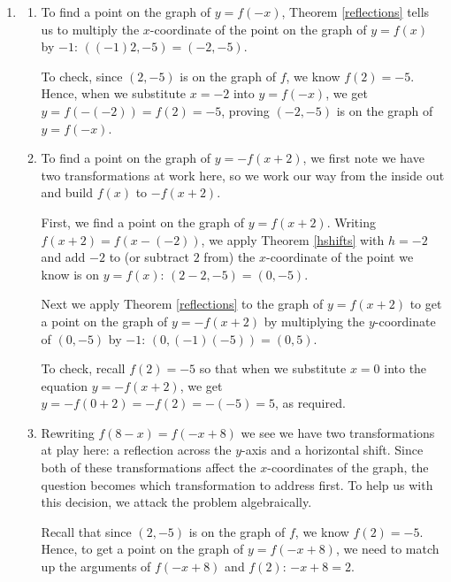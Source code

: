 \documentclass{ximera}
\begin{document}
\begin{example}
\begin{enumerate}
 \item 
 
 \begin{enumerate}
 
 \item To find a point on the graph of $y=f(-x)$, Theorem \ref{reflections} tells us to multiply the $x$-coordinate of the point on the graph of $y=f(x)$ by $-1$:  $((-1)2, -5) = (-2,-5)$.  
 
 \smallskip
 
 To check, since $(2,-5)$ is on the graph of $f$, we know $f(2) = -5$.  Hence, when we substitute $x=-2$ into $y = f(-x)$, we get $y = f(-(-2)) = f(2) = -5$, proving $(-2,-5)$ is on the graph of $y=f(-x)$.
 
 \item To find a point on the graph of $y = -f(x+2)$, we first note we have two transformations at work here, so we work our way from the inside out and build $f(x)$ to $-f(x+2)$. 
 
 \smallskip
 
 First, we find a point on the graph of $y=f(x+2)$.  Writing $f(x+2) = f(x-(-2))$, we apply Theorem \ref{hshifts} with $h=-2$ and add $-2$ to (or subtract $2$ from) the $x$-coordinate of the point we know is on $y=f(x)$:   $(2-2,-5) =  (0,-5)$. 
 
 \smallskip
 
  Next we apply Theorem \ref{reflections} to the graph of $y=f(x+2)$ to get a point on the graph of $y=-f(x+2)$ by multiplying the $y$-coordinate of $(0,-5)$ by $-1$:  $(0, (-1)(-5)) = (0,5)$.  
  
  \smallskip
  
  To check, recall $f(2)=-5$ so that when we substitute $x=0$ into the equation $y = -f(x+2)$, we get $y=-f(0+2) = -f(2) = -(-5)=5$, as required. 
 
 
 \item  Rewriting  $f(8-x) = f(-x+8)$ we see we have two transformations at play here:  a reflection across the $y$-axis and a horizontal shift.  Since both of these transformations affect the $x$-coordinates of the graph, the question becomes which transformation to address first. To help us with this decision, we attack the problem algebraically.  
 
 \smallskip
 
 Recall that since $(2,-5)$ is on the graph of $f$, we know  $f(2) = -5$.  Hence, to get a point on the graph of $y = f(-x+8)$, we need to match up the arguments of $f(-x+8)$ and $f(2)$:  $-x+8 = 2$.  
 

\end{enumerate}
\end{enumerate}
\end{example}
\end{document}
